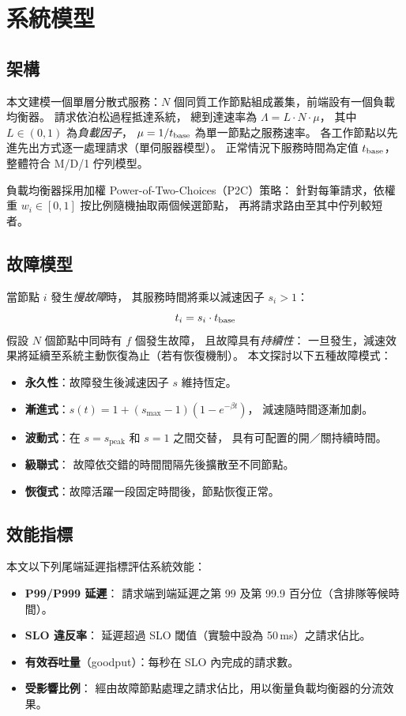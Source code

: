 \section{系統模型}
\label{sec:model}

\subsection{架構}

本文建模一個單層分散式服務：$N$ 個同質工作節點組成叢集，前端設有一個負載均衡器。
請求依泊松過程抵達系統，
總到達速率為 $\Lambda = L \cdot N \cdot \mu$，
其中 $L \in (0, 1)$ 為\emph{負載因子}，
$\mu = 1/t_{\text{base}}$ 為單一節點之服務速率。
各工作節點以先進先出方式逐一處理請求（單伺服器模型）。
正常情況下服務時間為定值 $t_{\text{base}}$，整體符合 M/D/1 佇列模型。

負載均衡器採用加權 Power-of-Two-Choices（P2C）策略：
針對每筆請求，依權重 $w_i \in [0, 1]$ 按比例隨機抽取兩個候選節點，
再將請求路由至其中佇列較短者。

\subsection{故障模型}

當節點 $i$ 發生\emph{慢故障}時，
其服務時間將乘以減速因子 $s_i > 1$：
\[
  t_i = s_i \cdot t_{\text{base}}
\]
假設 $N$ 個節點中同時有 $f$ 個發生故障，
且故障具有\emph{持續性}：
一旦發生，減速效果將延續至系統主動恢復為止（若有恢復機制）。
本文探討以下五種故障模式：

\begin{itemize}
\item \textbf{永久性}：故障發生後減速因子 $s$ 維持恆定。
\item \textbf{漸進式}：$s(t) = 1 + (s_{\max}-1)(1-e^{-\beta t})$，
  減速隨時間逐漸加劇。
\item \textbf{波動式}：在 $s = s_{\text{peak}}$ 和 $s = 1$ 之間交替，
  具有可配置的開／關持續時間。
\item \textbf{級聯式}：
  故障依交錯的時間間隔先後擴散至不同節點。
\item \textbf{恢復式}：故障活躍一段固定時間後，節點恢復正常。
\end{itemize}

\subsection{效能指標}

本文以下列尾端延遲指標評估系統效能：
\begin{itemize}
\item \textbf{P99/P999 延遲}：
  請求端到端延遲之第 99 及第 99.9 百分位（含排隊等候時間）。
\item \textbf{SLO 違反率}：
  延遲超過 SLO 閾值（實驗中設為 50\,ms）之請求佔比。
\item \textbf{有效吞吐量}（goodput）：每秒在 SLO 內完成的請求數。
\item \textbf{受影響比例}：
  經由故障節點處理之請求佔比，用以衡量負載均衡器的分流效果。
\end{itemize}

